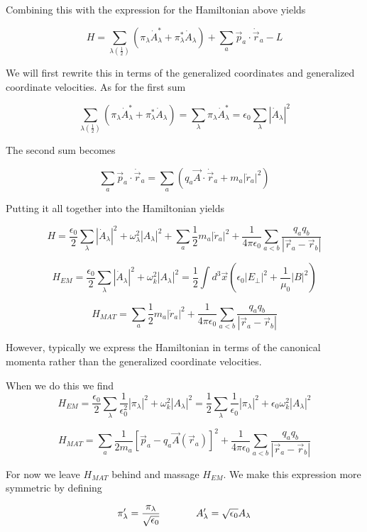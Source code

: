 \documentclass[12pt]{article}
\begin{document}
Combining this with the expression for the Hamiltonian above yields

\[H = \sum_{\lambda \left(\frac{1}{2}\right)} \left( \pi_{\lambda} \dot{A}_{\lambda}^* + \pi_{\lambda}^* \dot{A}_{\lambda} \right) +\sum_a \vec{p}_a \cdot \dot{\vec{r}}_a -L \]

We will first rewrite this in terms of the generalized coordinates and generalized coordinate velocities.
As for the first sum

\[\sum_{\lambda \left(\frac{1}{2}\right)} \left( \pi_{\lambda} \dot{A}_{\lambda}^* + \pi_{\lambda}^* \dot{A}_{\lambda} \right) = \sum_{\lambda}\pi_{\lambda}\dot{A}_{\lambda}^* = \epsilon_0 \sum_\lambda |\dot{A}_{\lambda}|^2 \]

The second sum becomes

\[\sum_a \vec{p}_a \cdot \dot{\vec{r}}_a = \sum_a \left(q_a \vec{A}\cdot\dot{\vec{r}}_a + m_a |\dot{r}_a|^2 \right) \]

Putting it all together into the Hamiltonian yields

\[H = \frac{\epsilon_0}{2}\sum_{\lambda}|\dot{A}_{\lambda}|^2 +\omega_{\lambda}^2|A_{\lambda}|^2 + \sum_a \frac{1}{2} m_a|\dot{r}_a|^2 +\frac{1}{4\pi\epsilon_0} \sum_{a<b} \frac{q_a q_b}{|\vec{r}_a-\vec{r}_b|} \]

\[H_{EM} = \frac{\epsilon_0}{2}\sum_{\lambda}|\dot{A}_{\lambda}|^2 +\omega_k^2|A_{\lambda}|^2 = \frac{1}{2}\int d^3\vec{x} \left(\epsilon_0 |E_{\perp}|^2 + \frac{1}{\mu_0}|B|^2 \right) \]

\[H_{MAT} = \sum_a \frac{1}{2} m_a|\dot{r}_a|^2 +\frac{1}{4\pi\epsilon_0} \sum_{a<b} \frac{q_a q_b}{|\vec{r}_a-\vec{r}_b|} \]

However, typically we express the Hamiltonian in terms of the canonical momenta rather than the generalized coordinate velocities.

When we do this we find 
\[H_{EM} = \frac{\epsilon_0}{2} \sum_{\lambda} \frac{1}{\epsilon_0^2} |\pi_\lambda|^2 +\omega_k^2|A_{\lambda}|^2 = \frac{1}{2} \sum_{\lambda} \frac{1}{\epsilon_0} |\pi_{\lambda}|^2 +\epsilon_0\omega_k^2|A_{\lambda}|^2 \] 
 
\[ H_{MAT} = \sum_a \frac{1}{2m_a} \left[\vec{p}_a - q_a \vec{A}(\vec{r}_a)\right]^2 +\frac{1}{4\pi\epsilon_0} \sum_{a<b} \frac{q_a q_b}{|\vec{r}_a-\vec{r}_b|}\] 
 
For now we leave $H_{MAT}$ behind and massage $H_{EM}$.
We make this expression more symmetric by defining

\[ \pi_{\lambda}' = \frac{\pi_{\lambda}}{\sqrt{\epsilon_0}} \hspace{.5 in} A_{\lambda}' = \sqrt{\epsilon_0} A_{\lambda} \]
\end{document}
